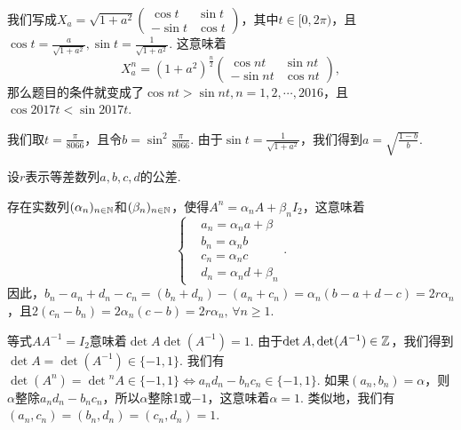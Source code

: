\begin{solution}
  我们写成$X_a=\sqrt{1+a^2}\begin{pmatrix}
    \cos t & \sin t \\
    -\sin t & \cos t
  \end{pmatrix}$，其中$t\in[0,2\pi)$，且$\cos t=\frac a{\sqrt{1+a^2}},\sin t=\frac1{\sqrt{1+a^2}}$. 这意味着
  \[
    X_a^n = (1 + a^{2})^{\frac n2}\begin{pmatrix}
      \cos nt & \sin nt \\
      -\sin nt & \cos nt
    \end{pmatrix},
  \]
  那么题目的条件就变成了$\cos nt>\sin nt,n=1,2,\cdots,2016$，且$\cos 2017t<\sin 2017t$.

  我们取$t=\frac\pi{8066}$，且令$b=\sin^2\frac\pi{8066}$. 由于$\sin t=\frac1{\sqrt{1+a^2}}$，我们得到$a=\sqrt{\frac{1-b}b}$.
\end{solution}

\begin{solution}
  设$r$表示等差数列$a,b,c,d$的公差.

  存在实数列$(\alpha_n)_{n\in\mathbb N}$和$(\beta_n)_{n\in\mathbb N}$，使得$A^n=\alpha_nA+\beta_nI_2$，这意味着
  \[
    \left\{
      \begin{aligned}
        & a_n = \alpha_na + \beta \\
        & b_n = \alpha_nb \\
        & c_n = \alpha_n c \\
        & d_n = \alpha_nd + \beta_n
      \end{aligned}
    \right..
  \]
  因此，$b_n-a_n+d_n-c_n=(b_n+d_n)-(a_n+c_n)=
  \alpha_n(b-a+d-c)=2r\alpha_n$，且$2(c_n-b_n)=2\alpha
  _n(c-b)=2r\alpha_n,\,\forall n\ge1$.
\end{solution}

\begin{solution}
  等式$AA^{-1}=I_2$意味着$\det A\det(A^{-1})=1$. 由于$\det A,\det(A^{-1})\in\mathbb Z$，我们得到$\det A=\det(A^{-1})\in\{-1,1\}$. 我们有$\det(A^n)=\det{}^nA\in\{-1,1\}\Leftrightarrow a_nd_n-b_nc_n\in\{-1,1\}$. 如果$(a_n,b_n)=\alpha$，则$\alpha$整除$a_nd_n-b_nc_n$，所以$\alpha$整除1或$-1$，这意味着$\alpha=1$. 类似地，我们有$(a_n,c_n)=(b_n,d_n)=(c_n,d_n)=1$.
\end{solution}

